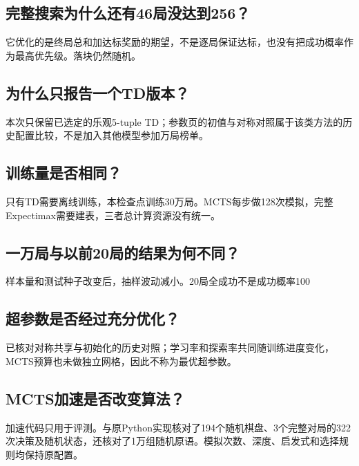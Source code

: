 \documentclass[UTF8,zihao=-4,fontset=none]{ctexart}
\begin{document}
\subsection*{完整搜索为什么还有46局没达到256？}

它优化的是终局总和加达标奖励的期望，不是逐局保证达标，也没有把成功概率作为最高优先级。落块仍然随机。

\subsection*{为什么只报告一个TD版本？}

本次只保留已选定的乐观5-tuple TD；参数页的初值与对称对照属于该类方法的历史配置比较，不是加入其他模型参加万局榜单。

\subsection*{训练量是否相同？}

只有TD需要离线训练，本检查点训练30万局。MCTS每步做128次模拟，完整Expectimax需要建表，三者总计算资源没有统一。

\subsection*{一万局与以前20局的结果为何不同？}

样本量和测试种子改变后，抽样波动减小。20局全成功不是成功概率100%

\subsection*{超参数是否经过充分优化？}

已核对对称共享与初始化的历史对照；学习率和探索率共同随训练进度变化，MCTS预算也未做独立网格，因此不称为最优超参数。

\subsection*{MCTS加速是否改变算法？}

加速代码只用于评测。与原Python实现核对了194个随机棋盘、3个完整对局的322次决策及随机状态，还核对了1万组随机原语。模拟次数、深度、启发式和选择规则均保持原配置。
\end{document}
